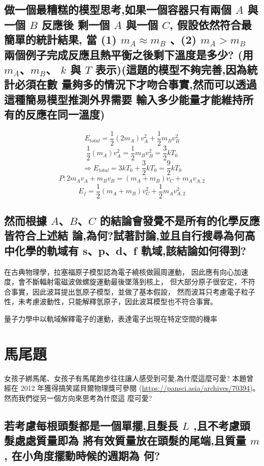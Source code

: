 \documentclass[UTF8,a4paper,12pt]{article}
\begin{document}
\subsection{做一個最糟糕的模型思考,如果一個容器只有兩個 \texorpdfstring{$A$}{A} 與
一個 \texorpdfstring{$B$}{B} 反應後
剩一個 \texorpdfstring{$A$}{A} 與一個 \texorpdfstring{$C$}{C}, 假設依然符合最簡單的統計結果, 當
(1) \texorpdfstring{$m_A ≈ m_B$}{mA ≈ mB}
、(2) \texorpdfstring{$m_A > m_B$}{mA>mB} 兩個例子完成反應且熱平衡之後剩下溫度是多少?
(用 \texorpdfstring{$m_A$}{mA}、\texorpdfstring{$m_B$}{mB}、
\texorpdfstring{$k$}{k} 與 \texorpdfstring{$T$}{T} 表示)(這題的模型不夠完善,因為統計必須在數
量夠多的情況下才吻合事實,然而可以透過這種簡易模型推測外界需要
輸入多少能量才能維持所有的反應在同一溫度)}

$$E_{total} = \frac{1}{2}(2m_A)v_A^2 + \frac{1}{2}m_Bv_B^2$$
$$\frac{1}{2}(m_A)v_A^2 = \frac{1}{2}m_Bv_B^2 = \frac{3}{2}kT_0$$
$$\Rightarrow E_{total} = 3kT_0 + \frac{3}{2}kT_0 = \frac{9}{2}kT_0$$
$$P: 2m_Av_A + m_Bv_B = (m_A + m_B)v_C + m_Av_{A,2}$$
$$E_f = \frac{1}{2}(m_A+m_B)v_C^2 + \frac{1}{2}m_Av_{A,2}^2 $$

\subsection{然而根據 \texorpdfstring{$A$}{A}、\texorpdfstring{$B$}{B}、\texorpdfstring{$C$}{C} 的結論會發覺不是所有的化學反應皆符合上述結
論,為何?試著討論,並且自行搜尋為何高中化學的軌域有
s、p、d、f 軌域,該結論如何得到?}

在古典物理學，拉塞福原子模型認為電子繞核做圓周運動，
因此應有向心加速度，會不斷輻射電磁波做螺旋運動最後墜落到核上，
但大部分原子很安定，不符合事實，因此波耳提出氫原子模型，並做了基本假設，
然而波耳只考慮電子粒子性，未考慮波動性，只能解釋氫原子，因此波耳模型也不符合事實。

量子力學中以軌域解釋電子的運動，表達電子出現在特定空間的機率

\section{馬尾題}

女孩子綁馬尾、女孩子有馬尾跑步往往讓人感受到可愛,為什麼這麼可愛?
本題曾經在 2012 年獲得搞笑諾貝爾物理獎可參閱
(\url{https://pansci.asia/archives/70394})。然而我們從另一個方向來思考為什麼這
麼可愛?

\subsection{若考慮每根頭髮都是一個單擺,且髮長 \texorpdfstring{$L$}{L} ,且不考慮頭髮處處質量即為
將有效質量放在頭髮的尾端,且質量 \texorpdfstring{$m$}{m}, 在小角度擺動時候的週期為
何?}
\end{document}
